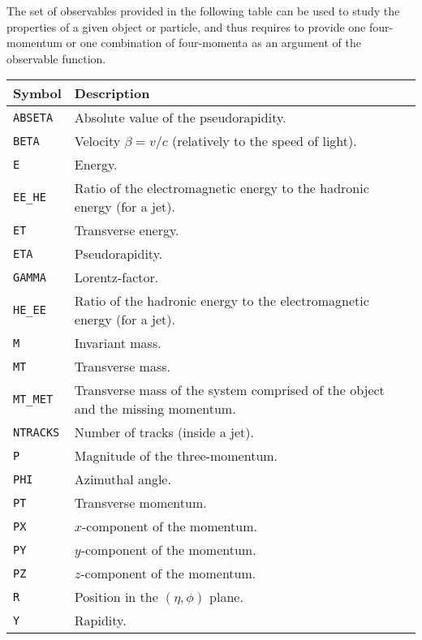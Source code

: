 \documentclass[a4paper]{article}
\begin{document}
The set of observables provided in the following table can be used to study the
properties of a given object or particle, and thus requires to provide one
four-momentum or one combination of four-momenta as an argument of the
observable function.
\renewcommand{\arraystretch}{1.2}%
\begin{center}\begin{tabular}{l p{10.2cm}}
\hline
Symbol& Description\\
\hline
\color{ao} \verb?ABSETA? & Absolute value of the pseudorapidity.\\
\color{ao} \verb?BETA?   & Velocity $\beta=v/c$ (relatively to the speed of light).\\
\color{ao} \verb?E?      & Energy.\\
\color{ao} \verb?EE_HE?  & Ratio of the electromagnetic energy to the hadronic energy (for
   a jet).\\
\color{ao} \verb?ET?     & Transverse energy.\\
\color{ao} \verb?ETA?    & Pseudorapidity.\\
\color{ao} \verb?GAMMA?  & Lorentz-factor.\\
\color{ao} \verb?HE_EE?  & Ratio of the hadronic energy to the electromagnetic energy (for
   a jet).\\
\color{ao} \verb?M?      & Invariant mass.\\
\color{ao} \verb?MT?     & Transverse mass.\\
\color{ao} \verb?MT_MET? & Transverse mass of the system comprised of the object and the
   missing momentum.\\
\color{ao} \verb?NTRACKS?& Number of tracks (inside a jet).\\
\color{ao} \verb?P?      & Magnitude of the three-momentum.\\
\color{ao} \verb?PHI?    & Azimuthal angle.\\
\color{ao} \verb?PT?     & Transverse momentum.\\
\color{ao} \verb?PX?     & $x$-component of the momentum.\\
\color{ao} \verb?PY?     & $y$-component of the momentum.\\
\color{ao} \verb?PZ?     & $z$-component of the momentum.\\
\color{ao} \verb?R?      & Position in the $(\eta, \phi)$ plane.\\
\color{ao} \verb?Y?      & Rapidity.\\
\hline
\end{tabular}
\end{center}
\end{document}
